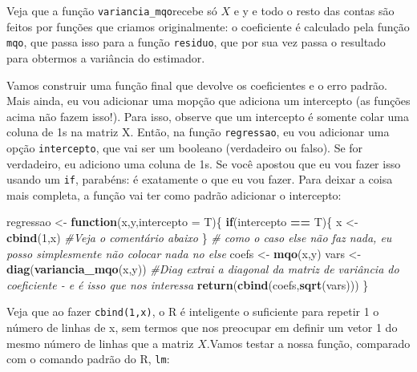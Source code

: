 \documentclass[
]{book}
\newenvironment{Shaded}{\begin{snugshade}}{\end{snugshade}}
\newcommand{\CommentTok}[1]{\textcolor[rgb]{0.56,0.35,0.01}{\textit{#1}}}
\newcommand{\ControlFlowTok}[1]{\textcolor[rgb]{0.13,0.29,0.53}{\textbf{#1}}}
\newcommand{\DataTypeTok}[1]{\textcolor[rgb]{0.13,0.29,0.53}{#1}}
\newcommand{\DecValTok}[1]{\textcolor[rgb]{0.00,0.00,0.81}{#1}}
\newcommand{\KeywordTok}[1]{\textcolor[rgb]{0.13,0.29,0.53}{\textbf{#1}}}
\newcommand{\NormalTok}[1]{#1}
\newcommand{\OperatorTok}[1]{\textcolor[rgb]{0.81,0.36,0.00}{\textbf{#1}}}
\newcommand{\StringTok}[1]{\textcolor[rgb]{0.31,0.60,0.02}{#1}}
\begin{document}
Veja que a função \texttt{variancia\_mqo}recebe só \(X\) e y e todo o resto das contas são feitos por funções que criamos originalmente: o coeficiente é calculado pela função \texttt{mqo}, que passa isso para a função \texttt{residuo}, que por sua vez passa o resultado para obtermos a variância do estimador.

Vamos construir uma função final que devolve os coeficientes e o erro padrão. Mais ainda, eu vou adicionar uma mopção que adiciona um intercepto (as funções acima não fazem isso!). Para isso, observe que um intercepto é somente colar uma coluna de 1s na matriz X. Então, na função \texttt{regressao}, eu vou adicionar uma opção \texttt{intercepto}, que vai ser um booleano (verdadeiro ou falso). Se for verdadeiro, eu adiciono uma coluna de 1s. Se você apostou que eu vou fazer isso usando um \texttt{if}, parabéns: é exatamente o que eu vou fazer. Para deixar a coisa mais completa, a função vai ter como padrão adicionar o intercepto:

\begin{Shaded}
\begin{Highlighting}[]
\NormalTok{regressao \textless{}{-}}\StringTok{ }\ControlFlowTok{function}\NormalTok{(x,y,}\DataTypeTok{intercepto =}\NormalTok{ T)\{}
  \ControlFlowTok{if}\NormalTok{(intercepto }\OperatorTok{==}\StringTok{ }\NormalTok{T)\{}
\NormalTok{    x \textless{}{-}}\StringTok{ }\KeywordTok{cbind}\NormalTok{(}\DecValTok{1}\NormalTok{,x) }\CommentTok{\#Veja o comentário abaixo}
\NormalTok{  \} }\CommentTok{\# como o caso else não faz nada, eu posso simplesmente não colocar nada no else}
\NormalTok{  coefs \textless{}{-}}\StringTok{ }\KeywordTok{mqo}\NormalTok{(x,y)}
\NormalTok{  vars \textless{}{-}}\StringTok{ }\KeywordTok{diag}\NormalTok{(}\KeywordTok{variancia\_mqo}\NormalTok{(x,y)) }\CommentTok{\#Diag extrai a diagonal da matriz de variância do coeficiente {-} e é isso que nos interessa}
  \KeywordTok{return}\NormalTok{(}\KeywordTok{cbind}\NormalTok{(coefs,}\KeywordTok{sqrt}\NormalTok{(vars)))}
\NormalTok{\}}
\end{Highlighting}
\end{Shaded}

Veja que ao fazer \texttt{cbind(1,x)}, o R é inteligente o suficiente para repetir 1 o número de linhas de x, sem termos que nos preocupar em definir um vetor 1 do mesmo número de linhas que a matriz \(X\).Vamos testar a nossa função, comparado com o comando padrão do R, \texttt{lm}:
\end{document}
